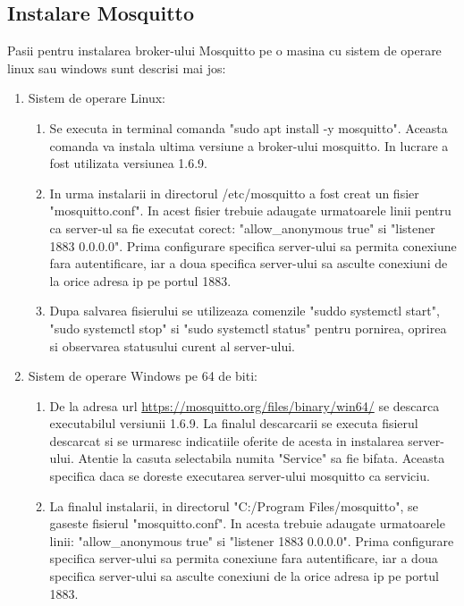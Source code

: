 \subsection{Instalare Mosquitto}\label{subsec:iu_instalare_mosquitto}
Pasii pentru instalarea broker-ului Mosquitto pe o masina cu sistem de operare linux sau windows sunt descrisi mai jos:
\begin{enumerate}
    \item Sistem de operare Linux:
    \begin{enumerate}
        \item Se executa in terminal comanda "sudo apt install -y mosquitto". Aceasta comanda va instala ultima versiune a broker-ului mosquitto. In lucrare 
        a fost utilizata versiunea 1.6.9.
        \item In urma instalarii in directorul /etc/mosquitto a fost creat un fisier "mosquitto.conf". In acest fisier trebuie adaugate urmatoarele linii pentru ca 
        server-ul sa fie executat corect: "allow\_anonymous true" si "listener 1883 0.0.0.0". Prima configurare specifica server-ului sa permita conexiune fara autentificare, 
        iar a doua specifica server-ului sa asculte conexiuni de la orice adresa ip pe portul 1883.
        \item Dupa salvarea fisierului se utilizeaza comenzile "suddo systemctl start", "sudo systemctl stop" si "sudo systemctl status" pentru pornirea, oprirea si observarea 
        statusului curent al server-ului.
    \end{enumerate}
    \item Sistem de operare Windows pe 64 de biti:
    \begin{enumerate}
        \item De la adresa url \url{https://mosquitto.org/files/binary/win64/} se descarca executabilul versiunii 1.6.9. La finalul descarcarii se executa fisierul descarcat 
        si se urmaresc indicatiile oferite de acesta in instalarea server-ului. Atentie la casuta selectabila numita "Service" sa fie bifata. Aceasta specifica daca se 
        doreste executarea server-ului mosquitto ca serviciu.
        \item La finalul instalarii, in directorul "C:/Program Files/mosquitto", se gaseste fisierul "mosquitto.conf". In acesta trebuie adaugate urmatoarele linii: 
        "allow\_anonymous true" si "listener 1883 0.0.0.0". Prima configurare specifica server-ului sa permita conexiune fara autentificare, 
        iar a doua specifica server-ului sa asculte conexiuni de la orice adresa ip pe portul 1883. 
    \end{enumerate}
\end{enumerate}
